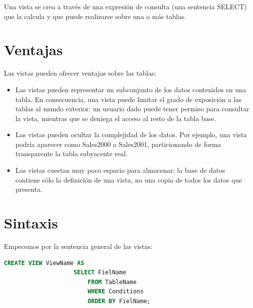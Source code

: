 \documentclass[12pt, fleqn]{report}                             %
\begin{document}
        Una vista se crea a través de una expresión de consulta (una sentencia SELECT) que la calcula y que puede
        realizarse sobre una o más tablas.


        \section{Ventajas}

            Las vistas pueden ofrecer ventajas sobre las tablas:

            \begin{itemize}

                \item
                    Las vistas pueden representar un subconjunto de los datos contenidos en una tabla.
                    En consecuencia, una vista puede limitar el grado de exposición a las tablas al mundo exterior:
                    un usuario dado puede tener permiso para consultar la vista, mientras que se deniega el acceso
                    al resto de la tabla base.

                \item
                    Las vistas pueden ocultar la complejidad de los datos.
                    Por ejemplo, una vista podría aparecer como Sales2000 o Sales2001, particionando
                    de forma transparente la tabla subyacente real.

                \item 
                    Las vistas cuestan muy poco espacio para almacenar; la base de datos contiene sólo
                    la definición de una vista, no una copia de todos los datos que presenta.

            \end{itemize}



        \section{Sintaxis}

            Empecemos por la sentencia general de las vistas:

            \begin{lstlisting}[language=SQL, gobble=16]
                CREATE VIEW ViewName AS
                    SELECT FielName
                        FROM TableName
                        WHERE Conditions
                        ORDER BY FielName; 
            \end{lstlisting}
\end{document}
